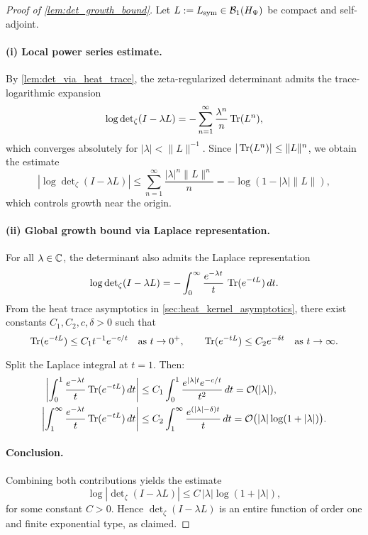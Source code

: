 \begin{proof}[Proof of \cref{lem:det_growth_bound}]
Let \( L := L_{\mathrm{sym}} \in \mathcal{B}_1(H_{\Psi}) \) be compact and self-adjoint.

\paragraph{(i) Local power series estimate.}
By \cref{lem:det_via_heat_trace}, the zeta-regularized determinant admits the trace-logarithmic expansion
\[
\log \det\nolimits_\zeta(I - \lambda L)
= - \sum_{n=1}^\infty \frac{\lambda^n}{n} \operatorname{Tr}(L^n),
\]
which converges absolutely for \( |\lambda| < \|L\|^{-1} \). Since \( |\operatorname{Tr}(L^n)| \le \|L\|^n \), we obtain the estimate
\[
\left| \log \det\nolimits_\zeta(I - \lambda L) \right|
\le \sum_{n=1}^\infty \frac{|\lambda|^n \|L\|^n}{n}
= -\log(1 - |\lambda| \|L\|),
\]
which controls growth near the origin.

\paragraph{(ii) Global growth bound via Laplace representation.}
For all \( \lambda \in \mathbb{C} \), the determinant also admits the Laplace representation
\[
\log \det\nolimits_\zeta(I - \lambda L)
= - \int_0^\infty \frac{e^{-\lambda t}}{t} \, \operatorname{Tr}(e^{-tL}) \, dt.
\]
From the heat trace asymptotics in \cref{sec:heat_kernel_asymptotics}, there exist constants \( C_1, C_2, c, \delta > 0 \) such that
\[
\operatorname{Tr}(e^{-tL}) \le C_1 t^{-1} e^{-c/t} \quad \text{as } t \to 0^+, \qquad
\operatorname{Tr}(e^{-tL}) \le C_2 e^{-\delta t} \quad \text{as } t \to \infty.
\]

Split the Laplace integral at \( t = 1 \). Then:
\begin{align*}
\left| \int_0^1 \frac{e^{-\lambda t}}{t} \operatorname{Tr}(e^{-tL})\, dt \right|
&\le C_1 \int_0^1 \frac{e^{|\lambda| t} e^{-c/t}}{t^2} \, dt = \mathcal{O}(|\lambda|), \\
\left| \int_1^\infty \frac{e^{-\lambda t}}{t} \operatorname{Tr}(e^{-tL})\, dt \right|
&\le C_2 \int_1^\infty \frac{e^{(|\lambda| - \delta)t}}{t} \, dt = \mathcal{O}\big(|\lambda| \log(1 + |\lambda|)\big).
\end{align*}

\paragraph{Conclusion.}
Combining both contributions yields the estimate
\[
\log \left| \det\nolimits_\zeta(I - \lambda L) \right| \le C\, |\lambda| \log(1 + |\lambda|),
\]
for some constant \( C > 0 \). Hence \( \det\nolimits_\zeta(I - \lambda L) \) is an entire function of order one and finite exponential type, as claimed.
\end{proof}
